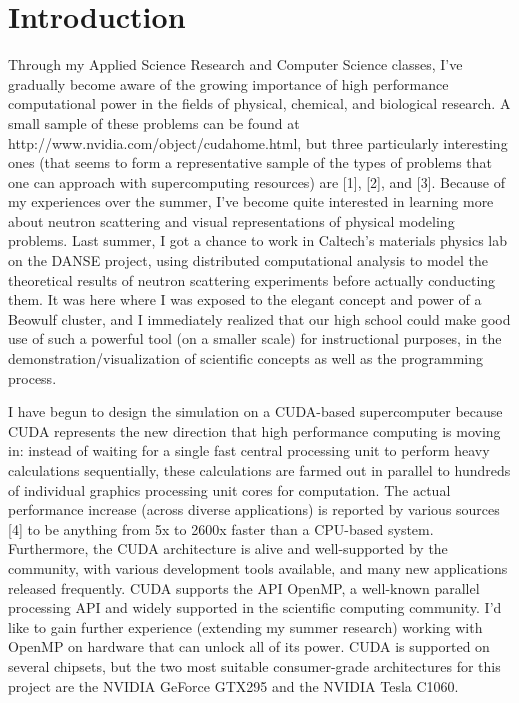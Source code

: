 \documentclass[10pt]{article}
\begin{document}
\section{Introduction} %
Through my Applied Science Research and Computer Science classes, I've gradually become aware of the growing importance of high performance computational power in the fields of physical, chemical, and biological research. A small sample of these problems can be found at http://www.nvidia.com/object/cudahome.html, but three particularly interesting ones (that seems to form a representative sample of the types of problems that one can approach with supercomputing resources) are [1], [2], and [3]. Because of my experiences over the summer, I've become quite interested in learning more about neutron scattering and visual representations of physical modeling problems. Last summer, I got a chance to work in Caltech's materials physics lab on the DANSE project, using distributed computational analysis to model the theoretical results of neutron scattering experiments before actually conducting them. It was here where I was exposed to the elegant concept and power of a Beowulf cluster, and I immediately realized that our high school could make good use of such a powerful tool (on a smaller scale) for instructional purposes, in the demonstration/visualization of scientific concepts as well as the programming process.

I have begun to design the simulation on a CUDA-based supercomputer because CUDA represents the new direction that high performance computing is moving in: instead of waiting for a single fast central processing unit to perform heavy calculations sequentially, these calculations are farmed out in parallel to hundreds of individual graphics processing unit cores for computation. The actual performance increase (across diverse applications) is reported by various sources [4] to be anything from 5x to 2600x faster than a CPU-based system. Furthermore, the CUDA architecture is alive and well-supported by the community, with various development tools available, and many new applications released frequently. CUDA supports the API OpenMP, a well-known parallel processing API and widely supported in the scientific computing community. I'd like to gain further experience (extending my summer research) working with OpenMP on hardware that can unlock all of its power. CUDA is supported on several chipsets, but the two most suitable consumer-grade architectures for this project are the NVIDIA GeForce GTX295 and the NVIDIA Tesla C1060. 
\end{document}
